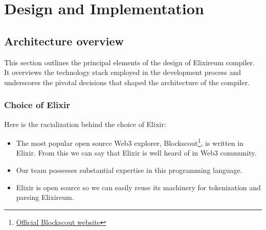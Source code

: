 \chapter{Design and Implementation}
\label{chap:impl}









\section{Architecture overview}
\label{sec:architecture}

This section outlines the principal elements of the design of Elixireum compiler. It overviews the technology stack employed in the development process and underscores the pivotal decisions that shaped the architecture of the compiler.


\subsection{Choice of Elixir}
Here is the racialization behind the choice of Elixir:
\begin{itemize}
    \item The most popular open source Web3 explorer, Blockscout\footnote{\href{https://www.blockscout.com/}{Official Blockscout website}}, is written in Elixir. From this we can say that Elixir is well heard of in Web3 community.
    \item Our team possesses substantial expertise in this programming language.
    \item Elixir is open source so we can easily reuse its machinery for tokenization and parsing Elixireum.
\end{itemize}

